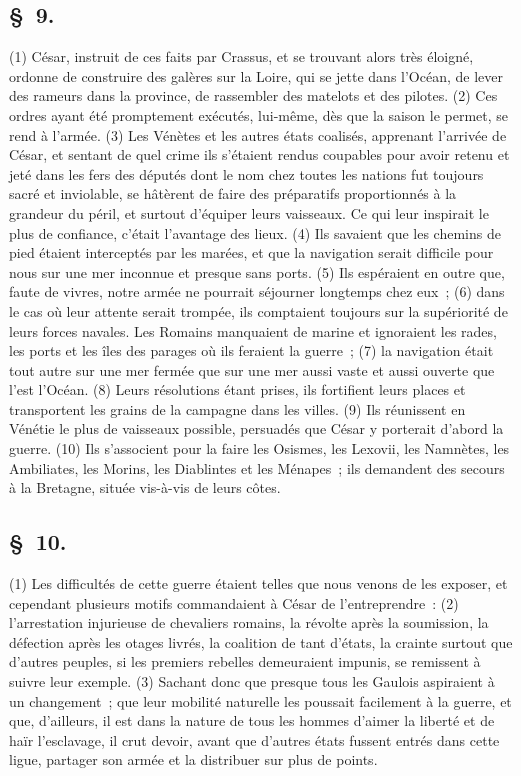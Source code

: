 \documentclass[french,twoside]{book} %
\begin{document}
\subsection[{§ 9.}]{ \textsc{§ 9.} }
\noindent (1) César, instruit de ces faits par Crassus, et se trouvant alors très éloigné, ordonne de construire des galères sur la Loire, qui se jette dans l’Océan, de lever des rameurs dans la province, de rassembler des matelots et des pilotes. (2) Ces ordres ayant été promptement exécutés, lui-même, dès que la saison le permet, se rend à l’armée. (3) Les Vénètes et les autres états coalisés, apprenant l’arrivée de César, et sentant de quel crime ils s’étaient rendus coupables pour avoir retenu et jeté dans les fers des députés dont le nom chez toutes les nations fut toujours sacré et inviolable, se hâtèrent de faire des préparatifs proportionnés à la grandeur du péril, et surtout d’équiper leurs vaisseaux. Ce qui leur inspirait le plus de confiance, c’était l’avantage des lieux. (4) Ils savaient que les chemins de pied étaient interceptés par les marées, et que la navigation serait difficile pour nous sur une mer inconnue et presque sans ports. (5) Ils espéraient en outre que, faute de vivres, notre armée ne pourrait séjourner longtemps chez eux ; (6) dans le cas où leur attente serait trompée, ils comptaient toujours sur la supériorité de leurs forces navales. Les Romains manquaient de marine et ignoraient les rades, les ports et les îles des parages où ils feraient la guerre ; (7) la navigation était tout autre sur une mer fermée que sur une mer aussi vaste et aussi ouverte que l’est l’Océan. (8) Leurs résolutions étant prises, ils fortifient leurs places et transportent les grains de la campagne dans les villes. (9) Ils réunissent en Vénétie le plus de vaisseaux possible, persuadés que César y porterait d’abord la guerre. (10) Ils s’associent pour la faire les Osismes, les Lexovii, les Namnètes, les Ambiliates, les Morins, les Diablintes et les Ménapes ; ils demandent des secours à la Bretagne, située vis-à-vis de leurs côtes.
\subsection[{§ 10.}]{ \textsc{§ 10.} }
\noindent (1) Les difficultés de cette guerre étaient telles que nous venons de les exposer, et cependant plusieurs motifs commandaient à César de l’entreprendre : (2) l’arrestation injurieuse de chevaliers romains, la révolte après la soumission, la défection après les otages livrés, la coalition de tant d’états, la crainte surtout que d’autres peuples, si les premiers rebelles demeuraient impunis, se remissent à suivre leur exemple. (3) Sachant donc que presque tous les Gaulois aspiraient à un changement ; que leur mobilité naturelle les poussait facilement à la guerre, et que, d’ailleurs, il est dans la nature de tous les hommes d’aimer la liberté et de haïr l’esclavage, il crut devoir, avant que d’autres états fussent entrés dans cette ligue, partager son armée et la distribuer sur plus de points.
\end{document}
